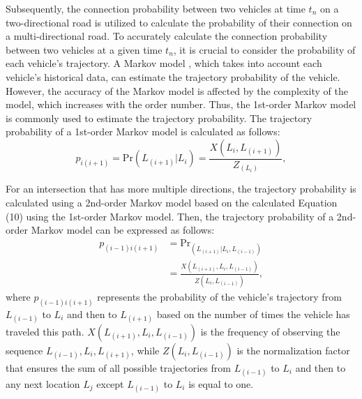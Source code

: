 \documentclass[sensors,article,accept,moreauthors,pdftex]{Definitions/mdpi}
\begin{document}
Subsequently, the connection probability between two vehicles at time $t_{n}$ on a two-directional road is utilized to calculate the probability of their connection on a multi-directional road.
To accurately calculate the connection probability between two vehicles at a given time $t_n$, it is crucial to consider the probability of each vehicle's trajectory. A Markov model \cite{Markov2013}, which takes into account each vehicle's historical data, can estimate the trajectory probability of the vehicle. However, the accuracy of the Markov model is affected by the complexity of the model, which increases with the order number. 
Thus, the 1st-order Markov model is commonly used to estimate the trajectory probability. 
The trajectory probability of a 1st-order Markov model is calculated as follows:
\begin{equation}
{p}_{i(i+1)}=\mathrm{Pr}(L_{(i+1)}|L_i)=\frac{X(L_i,L_{(i+1)})}{Z_{(L_i)}},
\end{equation}

For an intersection that has more multiple directions, the trajectory probability is calculated using a 2nd-order Markov model based on the calculated Equation (10) using the 1st-order Markov model.
Then, the trajectory probability of a 2nd-order Markov model can be expressed as follows:
\begin{align}
    {p}_{(i-1)i(i+1)}&=\mathrm{Pr}_(L_{(i+1)}|L_i,L_{(i-1)})\\
    &=\frac{X(L_{(i+1)},L_i,L_{(i-1)})}{Z(L_i, L_{(i-1)})}, 
\end{align}
where ${p}_{(i-1)i(i+1)}$ represents the probability of the vehicle's trajectory from $L_{(i-1)}$ to $L_i$ and then to $L_{(i+1)}$ based on the number of times the vehicle has traveled this path. 
$X(L_{(i+1)},L_i,L_{(i-1)})$ is the frequency of observing the sequence $L_{(i-1)}, L_i, L_{(i+1)}$, while $Z(L_i, L_{(i-1)})$ is the normalization factor that ensures the sum of all possible trajectories from $L_{(i-1)}$ to $L_i$ and then to any next location $L_j$ except $L_{(i-1)}$ to $L_i$ is equal to one. 
\end{document}
